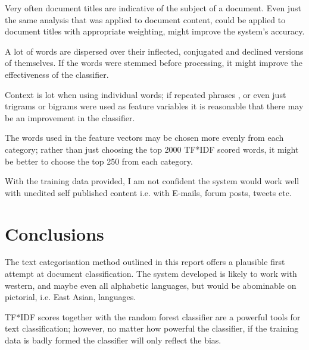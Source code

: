 \documentclass[11pt]{article}
\begin{document}
Very often document titles are indicative of the subject of a document. Even
just the same analysis that was applied to document content, could be applied
to document titles with appropriate weighting, might improve the system's
accuracy.

A lot of words are dispersed over their inflected, conjugated and declined
versions of themselves. If the words were stemmed before processing, it might
improve the effectiveness of the classifier.

Context is lot when using individual words; if repeated phrases , or even just
trigrams or bigrams were used as feature variables it is reasonable that there
may be an improvement in the classifier.

The words used in the feature vectors may be chosen more evenly from each
category; rather than just choosing the top 2000 TF*IDF scored words, it might
be better to choose the top 250 from each category.

With the training data provided, I am not confident the system would work well
with unedited self published content i.e. with E-mails, forum posts, tweets etc.

\section{Conclusions}

The text categorisation method outlined in this report offers a plausible first
attempt at document classification. The system developed is likely to work with
western, and maybe even all alphabetic languages, but would be abominable on
pictorial, i.e. East Asian, languages.  

TF*IDF scores together with the random forest classifier are a powerful tools
for text classification; however, no matter how powerful the classifier, if the
training data is badly formed the classifier will only reflect the bias.



\nocite{*}
\end{document}

